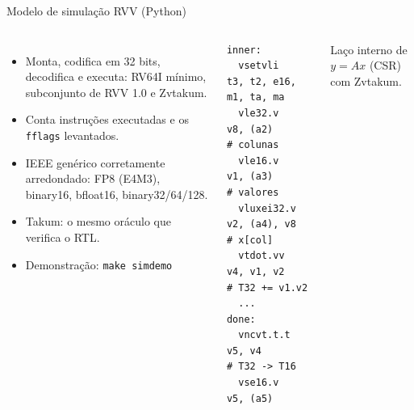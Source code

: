 \documentclass[aspectratio=169,10pt]{beamer}
\newcommand{\code}[1]{\texttt{#1}}
\begin{document}
\begin{frame}[fragile]{Modelo de simulação RVV (Python)}
  \begin{columns}[T]
    \begin{itemize}
      \item Monta, codifica em 32 bits, decodifica e executa: RV64I mínimo, subconjunto de RVV 1.0 e Zvtakum.
      \item Conta instruções executadas e os \code{fflags} levantados.
      \item IEEE genérico corretamente arredondado: FP8 (E4M3), binary16, bfloat16, binary32/64/128.
      \item Takum: o mesmo oráculo que verifica o RTL.
      \item Demonstração: \code{make simdemo}
    \end{itemize}
\begin{verbatim}
inner:
  vsetvli    t3, t2, e16, m1, ta, ma
  vle32.v    v8, (a2)      # colunas
  vle16.v    v1, (a3)      # valores
  vluxei32.v v2, (a4), v8  # x[col]
  vtdot.vv   v4, v1, v2    # T32 += v1.v2
  ...
done:
  vncvt.t.t  v5, v4        # T32 -> T16
  vse16.v    v5, (a5)
\end{verbatim}
    \footnotesize Laço interno de $y = Ax$ (CSR) com Zvtakum.
  \end{columns}
\end{frame}
\end{document}

